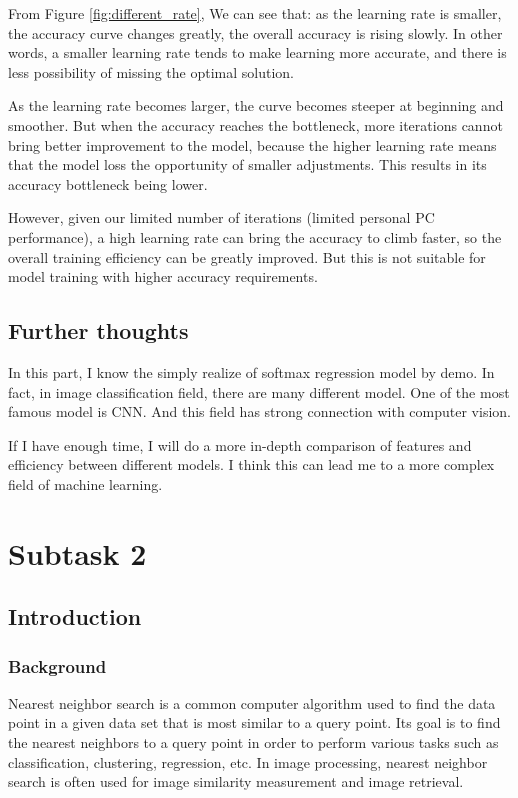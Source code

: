 \documentclass{article}
\begin{document}
From Figure \ref{fig:different_rate}, We can see that: as the learning rate is smaller, the accuracy curve changes greatly, the overall accuracy is rising slowly. In other words, a smaller learning rate tends to make learning more accurate, and there is less possibility of missing the optimal solution.

As the learning rate becomes larger, the curve becomes steeper at beginning and smoother. But when the accuracy reaches the bottleneck, more iterations cannot bring better improvement to the model, because the higher learning rate means that the model loss the opportunity of smaller adjustments. This results in its accuracy bottleneck being lower.

However, given our limited number of iterations (limited personal PC performance), a high learning rate can bring the accuracy to climb faster, so the overall training efficiency can be greatly improved. But this is not suitable for model training with higher accuracy requirements.

\subsection{Further thoughts}

In this part, I know the simply realize of softmax regression model by demo. In fact, in image classification field, there are many different model. One of the most famous model is CNN. And this field has strong connection with computer vision.

If I have enough time, I will do a more in-depth comparison of features and efficiency between different models. I think this can lead me to a more complex field of machine learning.

\section{Subtask 2}

\subsection{Introduction}
\subsubsection{Background}
Nearest neighbor search is a common computer algorithm used to find the data point in a given data set that is most similar to a query point. Its goal is to find the nearest neighbors to a query point in order to perform various tasks such as classification, clustering, regression, etc. In image processing, nearest neighbor search is often used for image similarity measurement and image retrieval.
\end{document}
